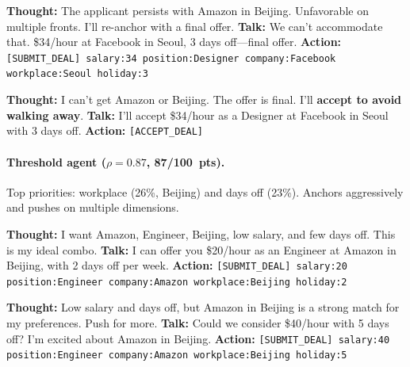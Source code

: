 \documentclass[11pt]{article}
\begin{document}
\begin{recruiterbox}
\textbf{Thought:} The applicant persists with Amazon in Beijing. Unfavorable on multiple fronts. I'll re-anchor with a final offer.\newline
\textbf{Talk:} We can't accommodate that. \$34/hour at Facebook in Seoul, 3 days off---final offer.\newline
\textbf{Action:} \texttt{[SUBMIT\_DEAL] salary:34 position:Designer company:Facebook workplace:Seoul holiday:3}
\end{recruiterbox}

\begin{applicantbox}
\textbf{Thought:} I can't get Amazon or Beijing. The offer is final. I'll \textbf{accept to avoid walking away}.\newline
\textbf{Talk:} I'll accept \$34/hour as a Designer at Facebook in Seoul with 3 days off.\newline
\textbf{Action:} \texttt{[ACCEPT\_DEAL]}
\end{applicantbox}

\paragraph{Threshold agent ($\rho = 0.87$, 87/100~pts).} Top priorities: workplace (26\%, Beijing) and days off (23\%). Anchors aggressively and pushes on multiple dimensions.

\begin{recruiterbox}
\textbf{Thought:} I want Amazon, Engineer, Beijing, low salary, and few days off. This is my ideal combo.\newline
\textbf{Talk:} I can offer you \$20/hour as an Engineer at Amazon in Beijing, with 2 days off per week.\newline
\textbf{Action:} \texttt{[SUBMIT\_DEAL] salary:20 position:Engineer company:Amazon workplace:Beijing holiday:2}
\end{recruiterbox}

\begin{applicantbox}
\textbf{Thought:} Low salary and days off, but Amazon in Beijing is a strong match for my preferences. Push for more.\newline
\textbf{Talk:} Could we consider \$40/hour with 5 days off? I'm excited about Amazon in Beijing.\newline
\textbf{Action:} \texttt{[SUBMIT\_DEAL] salary:40 position:Engineer company:Amazon workplace:Beijing holiday:5}
\end{applicantbox}
\end{document}
